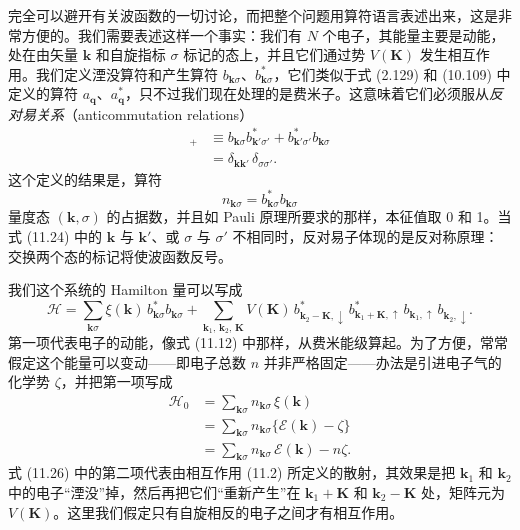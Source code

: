 完全可以避开有关波函数的一切讨论，而把整个问题用算符语言表述出来，这是非常方便的。我们需要表述这样一个事实：我们有 $N$ 个电子，其能量主要是动能，处在由矢量 $\mathbf{k}$ 和自旋指标 $\sigma$ 标记的态上，并且它们通过势 $V(\mathbf{K})$ 发生相互作用。我们定义湮没算符和产生算符 $b_{\mathbf{k}\sigma}$、$b^{*}_{\mathbf{k}\sigma}$，它们类似于式 (2.129) 和 (10.109) 中定义的算符 $a_{\mathbf{q}}$、$a^{*}_{\mathbf{q}}$，只不过我们现在处理的是费米子。这意味着它们必须服从\emph{反对易关系}（anticommutation relations）
\begin{align*}
[b_{\mathbf{k}\sigma},\,b^{*}_{\mathbf{k}'\sigma'}]_{+} &\equiv b_{\mathbf{k}\sigma}b^{*}_{\mathbf{k}'\sigma'}+b^{*}_{\mathbf{k}'\sigma'}b_{\mathbf{k}\sigma}\\
&=\delta_{\mathbf{k}\mathbf{k}'}\,\delta_{\sigma\sigma'}.
\tag{11.24}
\end{align*}
这个定义的结果是，算符
\begin{equation*}
n_{\mathbf{k}\sigma}=b^{*}_{\mathbf{k}\sigma}b_{\mathbf{k}\sigma}
\tag{11.25}
\end{equation*}
量度态 $(\mathbf{k},\sigma)$ 的占据数，并且如 Pauli 原理所要求的那样，本征值取 0 和 1。当式 (11.24) 中的 $\mathbf{k}$ 与 $\mathbf{k}'$、或 $\sigma$ 与 $\sigma'$ 不相同时，反对易子体现的是反对称原理：交换两个态的标记将使波函数反号。

我们这个系统的 Hamilton 量可以写成
\begin{equation*}
\mathcal{H}=\sum_{\mathbf{k}\sigma}\xi(\mathbf{k})\,b^{*}_{\mathbf{k}\sigma}b_{\mathbf{k}\sigma}+\sum_{\mathbf{k}_1,\,\mathbf{k}_2,\,\mathbf{K}}V(\mathbf{K})\,b^{*}_{\mathbf{k}_2-\mathbf{K},\downarrow}\,b^{*}_{\mathbf{k}_1+\mathbf{K},\uparrow}\,b_{\mathbf{k}_1,\uparrow}\,b_{\mathbf{k}_2,\downarrow}.
\tag{11.26}
\end{equation*}
第一项代表电子的动能，像式 (11.12) 中那样，从费米能级算起。为了方便，常常假定这个能量可以变动——即电子总数 $n$ 并非严格固定——办法是引进电子气的化学势 $\zeta$，并把第一项写成
\begin{align*}
\mathcal{H}_{0}&=\sum_{\mathbf{k}\sigma}n_{\mathbf{k}\sigma}\,\xi(\mathbf{k})\\
&=\sum_{\mathbf{k}\sigma}n_{\mathbf{k}\sigma}\{\mathcal{E}(\mathbf{k})-\zeta\}\\
&=\sum_{\mathbf{k}\sigma}n_{\mathbf{k}\sigma}\,\mathcal{E}(\mathbf{k})-n\zeta.
\tag{11.27}
\end{align*}
式 (11.26) 中的第二项代表由相互作用 (11.2) 所定义的散射，其效果是把 $\mathbf{k}_1$ 和 $\mathbf{k}_2$ 中的电子“湮没”掉，然后再把它们“重新产生”在 $\mathbf{k}_1+\mathbf{K}$ 和 $\mathbf{k}_2-\mathbf{K}$ 处，矩阵元为 $V(\mathbf{K})$。这里我们假定只有自旋相反的电子之间才有相互作用。

